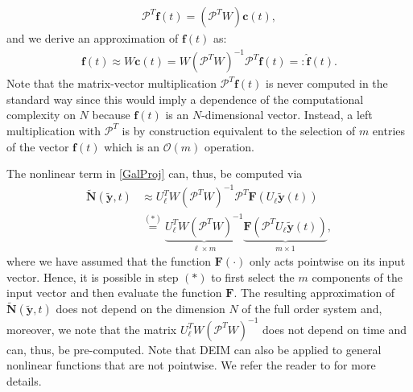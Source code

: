 \begin{align*}
\mathcal{P}^T \mathbf{f}(t) = (\mathcal{P}^T W) \mathbf{c}(t),
\end{align*}
and we derive an approximation of $\mathbf{f}(t)$ as:
\begin{align}
\label{approxF}
\mathbf{f}(t) \approx W \mathbf{c}(t) = W (\mathcal{P}^T W)^{-1} \mathcal{P}^T \mathbf{f}(t) =: \mathbf{\hat f}(t).
\end{align}
Note that the matrix-vector multiplication $\mathcal{P}^T \mathbf{f}(t)$ is never computed in the standard way since this would imply a dependence of the computational complexity on $N$ because $\mathbf{f}(t)$ is an $N$-dimensional vector. Instead, a left multiplication with $\mathcal{P}^T$ is by construction equivalent to the selection of $m$ entries of the vector $\mathbf{f}(t)$ which is an $\mathcal{O}(m)$ operation.

The nonlinear term in \eqref{GalProj} can, thus, be computed via
\begin{align*}
\mathbf{\tilde N}(\mathbf{\tilde y},t) &\approx U_\ell^T W (\mathcal{P}^T W)^{-1} \mathcal{P}^T \mathbf{F}(U_\ell \mathbf{\tilde y}(t))\\
&\stackrel{(\ast)}{=}\underbrace{U_\ell^T W (\mathcal{P}^T W)^{-1}}_{\ell \times m} \underbrace{\mathbf{F}(\mathcal{P}^T U_\ell \mathbf{\tilde y}(t))}_{m \times 1},
\end{align*}
where we have assumed that the function $\mathbf{F}(\cdot)$ only acts pointwise on its input vector. Hence, it is possible in step $(\ast)$ to first select the $m$ components of the input vector and then evaluate the function $\mathbf{F}$. The resulting approximation of $\mathbf{\tilde N}(\mathbf{\tilde y},t)$ does not depend on the dimension $N$ of the full order system and, moreover, we note that the matrix $U_\ell^T W (\mathcal{P}^T W)^{-1}$ does not depend on time and can, thus, be pre-computed. Note that DEIM can also be applied to general nonlinear functions that are not pointwise. We refer the reader to \cite{DEIM} for more details.

